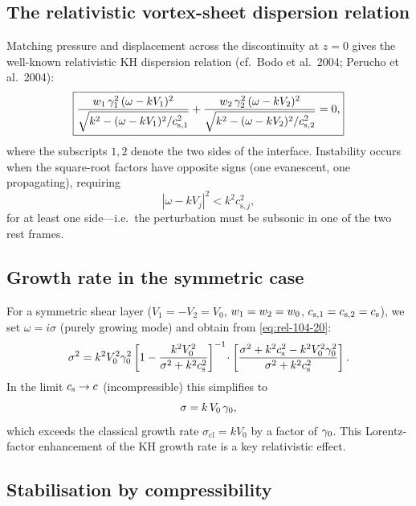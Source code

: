 \subsection{The relativistic vortex-sheet dispersion relation}
\label{sec:rel-11-104-comp-vs}

Matching pressure and displacement across the discontinuity at $z=0$
gives the well-known relativistic KH dispersion relation (cf.\
Bodo et al.\ 2004; Perucho et al.\ 2004):
\begin{equation}
\label{eq:rel-104-20}
\boxed{\frac{w_1\,\gamma_1^2\,(\omega-kV_1)^2}
       {\sqrt{k^2 - (\omega-kV_1)^2/c_{\mathrm{s},1}^2}}
+ \frac{w_2\,\gamma_2^2\,(\omega-kV_2)^2}
       {\sqrt{k^2 - (\omega-kV_2)^2/c_{\mathrm{s},2}^2}} = 0,}
\end{equation}
where the subscripts $1,2$ denote the two sides of the interface.
Instability occurs when the square-root factors have opposite signs
(one evanescent, one propagating), requiring
\begin{equation}
\label{eq:rel-104-21}
|\omega - kV_j|^2 < k^2 c_{\mathrm{s},j}^2,
\end{equation}
for at least one side---i.e.\ the perturbation must be subsonic in one
of the two rest frames.

\subsection{Growth rate in the symmetric case}
\label{sec:rel-11-104-comp-growth}

For a symmetric shear layer ($V_1=-V_2=V_0$,
$w_1=w_2=w_0$,
$c_{\mathrm{s},1}=c_{\mathrm{s},2}=c_{\mathrm{s}}$), we set
$\omega=i\sigma$ (purely growing mode) and obtain from
\eqref{eq:rel-104-20}:
\begin{equation}
\label{eq:rel-104-22}
\sigma^2 = k^2 V_0^2\gamma_0^2
\left[1 - \frac{k^2 V_0^2}{\sigma^2+k^2c_{\mathrm{s}}^2}\right]^{-1}
\!\cdot\left[\frac{\sigma^2+k^2c_{\mathrm{s}}^2-k^2V_0^2\gamma_0^2}
                  {\sigma^2+k^2c_{\mathrm{s}}^2}\right].
\end{equation}
In the limit $c_{\mathrm{s}}\to c$ (incompressible) this simplifies to
\begin{equation}
\label{eq:rel-104-23}
\sigma = k\,V_0\,\gamma_0,
\end{equation}
which exceeds the classical growth rate $\sigma_{\mathrm{cl}}=kV_0$
by a factor of $\gamma_0$.  This Lorentz-factor enhancement of the KH
growth rate is a key relativistic effect.

\subsection{Stabilisation by compressibility}
\label{sec:rel-11-104-comp-stab}

